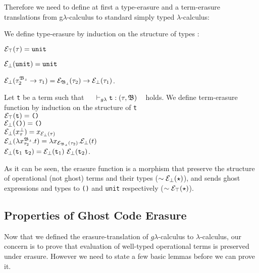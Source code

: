 Therefore we need to define at first a type-erasure and a term-erasure translations from g$\lambda$-calculus to standard simply typed  
$\lambda$-calculus:  

\begin{dfn} 
\label{type-erasure}
We define type-erasure by induction on the structure of types : \vspace{0.2cm} 

\noindent$ \mathcal{E}_{\top}(\tau) = \texttt{unit} $ 

\noindent$ \mathcal{E}_{\bot}(\texttt{unit}) = \texttt{unit}$ 

\noindent$ \mathcal{E}_{\bot}(\tau_{2}^{\mathfrak{B_{2}}} \rightarrow \tau_{1})  
= \mathcal{E}_{\mathfrak{B_{2}}}(\tau_{2}) \rightarrow \mathcal{E}_{\bot}(\tau_{1}) $. \\
\end{dfn} 

\begin{dfn} 
\label{term-erasure}
Let \texttt{t} be a term such that 
~~ $\vdash_{g\lambda} \texttt{t} : (\tau, \mathfrak{B})$ ~ holds. 
We define term-erasure function by induction on 
the structure of \texttt{t}\\[0.1cm]
$ \mathcal{E}_{\top}(\texttt{t}) = \texttt{()}$\\[0.05cm]
$\mathcal{E}_{\bot}(\texttt{()}) = \texttt{()}$\\[0.05cm]
$\mathcal{E}_{\bot}(x_{\tau}^{\bot}) = x_{\mathcal{E}_{\bot}(\tau)}$\\[0.05cm]  
$\mathcal{E}_{\bot}(\lambda x_{\tau_{2}}^{\mathfrak{B_{2}}}.t) 
= \lambda x_{\mathcal{E}_{\mathfrak{B_{2}}}(\tau_{2})}. \mathcal{E}_{\bot}(t)$\\[0.05cm]  
$\mathcal{E}_{\bot}(\texttt{t}_{1} ~ \texttt{t}_{2}) 
= \mathcal{E}_{\bot}(\texttt{t}_{1})  ~ \mathcal{E}_{\bot}(\texttt{t}_{2})$.
\end{dfn}
As it can be seen, the erasure function is a morphism that preserve
the structure of operational (not ghost) terms and their types ($\sim\mathcal{E}_{\bot}(\star)$), and sends ghost expressions and types to \texttt{()} and \texttt{unit} respectively ($\sim\mathcal{E}_{\top}(\star)$).




\subsection{Properties of Ghost Code Erasure}

Now that we defined the erasure-translation of $g\lambda$-calculus to $\lambda$-calculus, our concern is to prove that evaluation of well-typed operational terms is preserved under erasure. However we need to state a 
few basic lemmas before we can prove it. 



